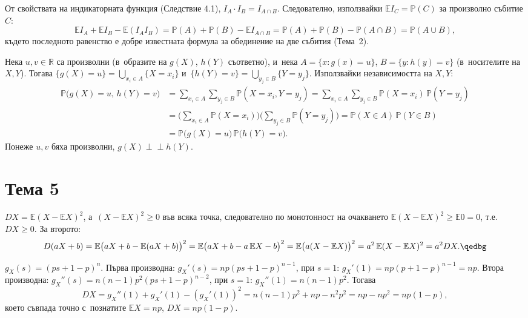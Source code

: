 \begin{proofbox}
От свойствата на индикаторната функция (Следствие 4.1), $I_A\cdot I_B
= I_{A\cap B}$. Следователно, използвайки $\mathbb EI_C=\mathbb P(C)$
за произволно събитие $C$:
\[
  \mathbb EI_A + \mathbb EI_B - \mathbb E(I_AI_B) = \mathbb P(A) +
  \mathbb P(B) - \mathbb E I_{A\cap B} = \mathbb P(A)+\mathbb P(B)-
  \mathbb P(A\cap B) = \mathbb P(A\cup B),
\]
където последното равенство е добре известната формула за
обединение на две събития (Тема~2). \qedbg
\end{proofbox}

\begin{proofbox}
Нека $u,v\in\mathbb R$ са произволни (в~образите на $g(X)$, $h(Y)$
съответно), и~нека $A=\{x : g(x)=u\}$, $B=\{y:h(y)=v\}$ (в~носителите на $X,Y$). Тогава $\{g(X)=u\}=\bigcup_{x_i\in A}\{X=x_i\}$
и~$\{h(Y)=v\}=\bigcup_{y_j\in B}\{Y=y_j\}$. Използвайки независимостта
на $X,Y$:
\begin{align*}
  \mathbb P\big(g(X)=u,\,h(Y)=v\big) &= \sum_{x_i\in A}\sum_{y_j\in
  B} \mathbb P(X=x_i,Y=y_j) = \sum_{x_i\in A}\sum_{y_j\in B} \mathbb
  P(X=x_i)\,\mathbb P(Y=y_j)\\
  &= \Big(\sum_{x_i\in A}\mathbb P(X=x_i)\Big)\Big(\sum_{y_j\in B}
  \mathbb P(Y=y_j)\Big) = \mathbb P(X\in A)\,\mathbb P(Y\in B)\\
  &= \mathbb P\big(g(X)=u\big)\,\mathbb P\big(h(Y)=v\big).
\end{align*}
Понеже $u,v$ бяха произволни, $g(X)\perp\!\!\!\perp h(Y)$. \qedbg
\end{proofbox}

\section*{Тема 5}

\begin{proofbox}
$DX=\mathbb E(X-\mathbb EX)^2$, а~$(X-\mathbb EX)^2\ge0$ във всяка
точка, следователно по монотонност на очакването $\mathbb E(X-
\mathbb EX)^2\ge \mathbb E0=0$, т.е.\ $DX\ge0$. За второто:
\[
  D(aX+b) = \mathbb E\big(aX+b-\mathbb E(aX+b)\big)^2 = \mathbb E
  \big(aX+b-a\,\mathbb EX-b\big)^2 = \mathbb E\big(a(X-\mathbb EX)
  \big)^2 = a^2\,\mathbb E(X-\mathbb EX)^2 = a^2DX. \qedbg
\]
\end{proofbox}

\begin{proofbox}
$g_X(s)=(ps+1-p)^n$. Първа производна: $g_X'(s)=np(ps+1-p)^{n-1}$,
при $s=1$: $g_X'(1)=np(p+1-p)^{n-1}=np$. Втора производна:
$g_X''(s)=n(n-1)p^2(ps+1-p)^{n-2}$, при $s=1$: $g_X''(1)=n(n-1)p^2$.
Тогава
\[
  DX = g_X''(1)+g_X'(1)-(g_X'(1))^2 = n(n-1)p^2+np-n^2p^2 = np-np^2
  = np(1-p),
\]
което съвпада точно с~познатите $\mathbb EX=np$, $DX=np(1-p)$.
\end{proofbox}

